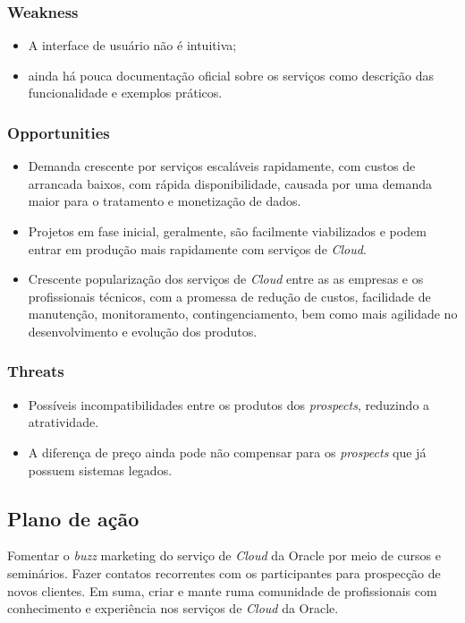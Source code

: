 \documentclass[a4paper]{article}
\begin{document}
\subsubsection{Weakness}

\begin{itemize}
\item A interface de usuário não é intuitiva;
\item ainda há pouca documentação oficial sobre os serviços como descrição das funcionalidade e exemplos práticos. 
\end{itemize}

\subsubsection{Opportunities}

\begin{itemize}
\item Demanda crescente por serviços escaláveis rapidamente, com custos de arrancada baixos, com rápida disponibilidade, causada por uma demanda maior para o tratamento e monetização de dados. 
\item Projetos em fase inicial, geralmente, são facilmente viabilizados e podem entrar em produção mais rapidamente com serviços de \emph{Cloud}. 
\item Crescente popularização dos serviços de \emph{Cloud} entre as as empresas e os profissionais técnicos, com a promessa de redução de custos, facilidade de manutenção, monitoramento, contingenciamento, bem como mais agilidade no desenvolvimento e evolução dos produtos.
\end{itemize}
\subsubsection{Threats}

\begin{itemize}
\item Possíveis incompatibilidades entre os produtos dos \emph{prospects}, reduzindo a atratividade.
\item A diferença de preço ainda pode não compensar para os \emph{prospects} que já possuem sistemas legados.
\end{itemize}

\subsection{Plano de ação}

Fomentar o \emph{buzz} marketing do serviço de \emph{Cloud} da Oracle por meio de cursos e seminários. Fazer contatos recorrentes com os participantes para prospecção de novos clientes. Em suma, criar e mante ruma comunidade de profissionais com conhecimento e experiência nos serviços de \emph{Cloud} da Oracle.
\end{document}
